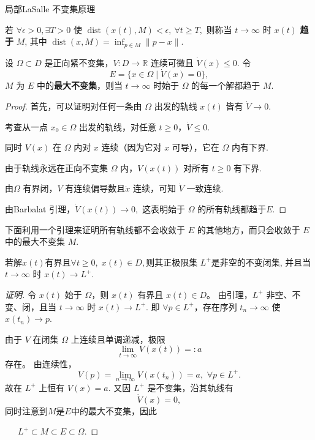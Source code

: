 \documentclass{beamer}
\begin{document}
	\begin{frame}{局部LaSalle 不变集原理}
		\begin{definition}
			若 \(\forall \epsilon>0,\exists T>0\) 使
			$
			\operatorname{dist}(x(t),M)<\epsilon,\ \forall t\ge T,
			$
			则称当 \(t\to\infty\) 时 \(x(t)\) \textbf{趋于} \(M\),
			其中 \(\operatorname{dist}(x,M)=\inf_{p\in M}\|p-x\|\).
		\end{definition}
		\begin{theorem}
			设 \(\Omega\subset D\) 是正向紧不变集，\(V:D\to\mathbb{R}\) 连续可微且 \(\dot V(x)\le 0\). 令
			\[
			E=\{x\in\Omega \mid \dot V(x)=0\},
			\]
			\(M\) 为 \(E\) 中的\textbf{最大不变集}，则当 \(t\to\infty\) 时始于 \(\Omega\) 的每一个解都趋于 \(M\).
		\end{theorem}
	\end{frame}
	\begin{frame}
		\begin{proof}
			首先，可以证明对任何一条由 \(\Omega\) 出发的轨线 \(x(t)\) 皆有 \(\dot{V} \to 0\).
			
			考查从一点 \(x_0 \in \Omega\) 出发的轨线，对任意 \(t \geq 0\)，\(\dot{V} \leq 0\).
			
			同时 \(V(x)\) 在 \(\Omega\) 内对 \(x\) 连续（因为它对 \(x\) 可导），它在 \(\Omega\) 内有下界.
			
			由于轨线永远在正向不变集 \(\Omega\) 内，\(V(x(t))\) 对所有 \(t \geq 0\) 有下界.
			
			由\(\Omega\) 有界闭，\(V\) 有连续偏导数且\(\dot{x}\) 连续，可知 \(\dot{V}\) 一致连续.
			
			由Barbalat 引理，$
			\dot{V}(x(t)) \to 0,$
			这表明始于 \(\Omega\) 的所有轨线都趋于$E$.
		\renewcommand{\qedsymbol}{}
		\end{proof}
		\medspace
		\par 下面利用一个引理来证明所有轨线都不会收敛于 \(E\) 的其他地方，而只会收敛于 \(E\) 中的最大不变集 \(M\).
		\begin{lemma}
			若解\(x(t)\)有界且\(\forall t\ge0,\; x(t)\in D,\)则其正极限集 \(L^+\)是非空的不变闭集, 并且当 \(t\to\infty\) 时 \(x(t)\to L^+\).
		\end{lemma}
	\end{frame}
	\begin{frame}
		\begin{proof}[证明]
			令 \(x(t)\) 始于 \(\Omega\)，则 \(x(t)\) 有界且 \(x(t)\in D\)。
			由引理，\(L^+\) 非空、不变、闭，且当 \(t\to\infty\) 时 \(x(t)\to L^+\).
			即 \(\forall p\in L^+\)，存在序列 \(t_n\to\infty\) 使 \(x(t_n)\to p\).
		
			由于 \(V\) 在闭集 \(\Omega\) 上连续且单调递减，极限
			\[
			\lim_{t\to\infty} V(x(t))=:a
			\]
			存在。
			由连续性，
			\[
			V(p)=\lim_{n\to\infty} V(x(t_n))=a,\,\, \forall p\in L^+.
			\]
			故在 \(L^+\) 上恒有 \(V(x)=a\).
			又因 \(L^+\) 是不变集，沿其轨线有
			\[
			\dot V(x)=0,
			\]
			同时注意到$M$是$E$中的最大不变集，因此
			\medskip
			\par \qquad \qquad \qquad \qquad \quad \ \ \ \qquad $
			L^+ \subset M \subset E \subset \Omega.
			$
		\end{proof}
	\end{frame}
\end{document}
